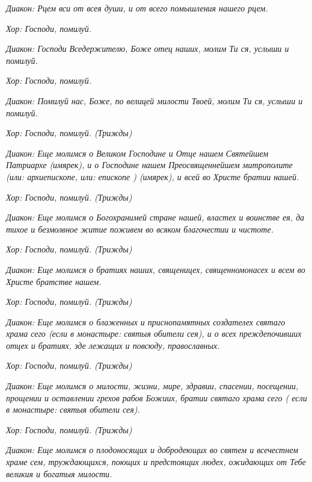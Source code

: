 \itshape Диакон:\normalfont{} Рцем вси от всея души, и от всего помышления нашего рцем.


\itshape Хор:\normalfont{} Господи, помилуй.


\itshape Диакон:\normalfont{} Господи Вседержителю, Боже отец наших, молим Ти ся, услыши и помилуй.


\itshape Хор:\normalfont{} Господи, помилуй.


\itshape Диакон:\normalfont{} Помилуй нас, Боже, по велицей милости Твоей, молим Ти ся, услыши и помилуй.


\itshape Хор:\normalfont{} Господи, помилуй. \itshape (Трижды)\normalfont{}


\itshape Диакон:\normalfont{} Еще молимся о Великом Господине и Отце нашем Святейшем Патриархе \itshape (имярек)\normalfont{}, и о Господине нашем Преосвященнейшем митрополите \itshape (или:\normalfont{} архиепископе, \itshape или:\normalfont{} епископе \itshape ) (имярек)\normalfont{}, и всей во Христе братии нашей.


\itshape Хор:\normalfont{} Господи, помилуй. \itshape (Трижды)\normalfont{}


\itshape Диакон:\normalfont{} Еще молимся о Богохранимей стране нашей, властех и воинстве ея, да тихое и безмолвное житие поживем во всяком благочестии и чистоте.


\itshape Хор:\normalfont{} Господи, помилуй. \itshape (Трижды)\normalfont{}


\itshape Диакон:\normalfont{} Еще молимся о братиях наших, священицех, священномонасех и всем во Христе братстве нашем.


\itshape Хор:\normalfont{} Господи, помилуй. \itshape (Трижды)\normalfont{}


\itshape Диакон:\normalfont{} Еще молимся о блаженных и приснопамятных создателех святаго храма сего \itshape (если в монастыре:\normalfont{} святыя обители сея), и о всех преждепочивших отцех и братиях, зде лежащих и повсюду, православных.


\itshape Хор:\normalfont{} Господи, помилуй. \itshape (Трижды)\normalfont{}


\itshape Диакон:\normalfont{} Еще молимся о милости, жизни, мире, здравии, спасении, посещении, прощении и оставлении грехов рабов Божиих, братии святаго храма сего ( \itshape если в монастыре:\normalfont{} святыя обители сея).


\itshape Хор:\normalfont{} Господи, помилуй. \itshape (Трижды)\normalfont{}


\itshape Диакон:\normalfont{} Еще молимся о плодоносящих и добродеющих во святем и всечестнем храме сем, труждающихся, поющих и предстоящих людех, ожидающих от Тебе великия и богатыя милости.


